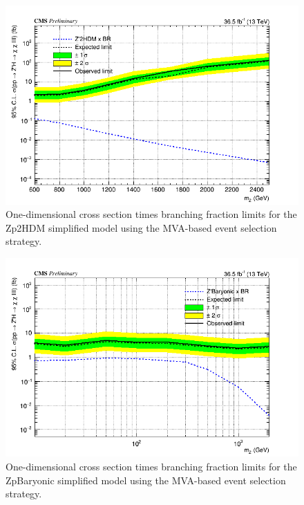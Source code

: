 \begin{figure}[tbh]
\centering
\includegraphics[width=5in]{figures/sigma_limits_4mu_Zp2HDM.png}
\caption{One-dimensional cross section times branching fraction limits for the Zp2HDM simplified model using the MVA-based event selection strategy.}
\label{fig:limzp2hdmmva}
\end{figure}

\begin{figure}[tbh]
\centering
\includegraphics[width=5in]{figures/sigma_limits_4mu_ZpBaryonic.png}
\caption{One-dimensional cross section times branching fraction limits for the ZpBaryonic simplified model using the MVA-based event selection strategy.}
\label{fig:limzpbaryonicmva}
\end{figure}


